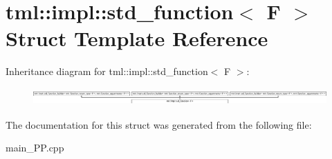 \hypertarget{structtml_1_1impl_1_1std__function}{\section{tml\+:\+:impl\+:\+:std\+\_\+function$<$ F $>$ Struct Template Reference}
\label{structtml_1_1impl_1_1std__function}
}
Inheritance diagram for tml\+:\+:impl\+:\+:std\+\_\+function$<$ F $>$\+:\begin{figure}[H]
\begin{center}
\leavevmode
\includegraphics[height=0.669056cm]{structtml_1_1impl_1_1std__function}
\end{center}
\end{figure}


The documentation for this struct was generated from the following file\+:\begin{DoxyCompactItemize}
\item 
main\+\_\+\+P\+P.\+cpp\end{DoxyCompactItemize}
